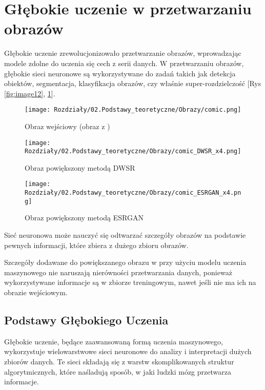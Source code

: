 
\section{Głębokie uczenie w przetwarzaniu obrazów}


Głębokie uczenie zrewolucjonizowało przetwarzanie obrazów, wprowadzając modele zdolne do uczenia się cech z serii danych. W przetwarzaniu obrazów, głębokie sieci neuronowe są wykorzystywane do zadań takich jak detekcja obiektów, segmentacja, klasyfikacja obrazów, czy właśnie super-rozdzielczość [Rys \ref{fig:image12},  \ref{fig:image13}].

\begin{figure}[ht]
    \centering
    \begin{minipage}[t]{0.3\linewidth}
        \texttt{[image: Rozdziały/02.Podstawy\_teoretyczne/Obrazy/comic.png]}
        \caption{Obraz wejściowy (obraz z \cite{zeyde2010single})}
        \label{fig:image11}
    \end{minipage}
    \hspace{0.5cm}
    \begin{minipage}[t]{0.3\linewidth}
        \texttt{[image: Rozdziały/02.Podstawy\_teoretyczne/Obrazy/comic\_DWSR\_x4.png]}
        \caption{Obraz powiększony metodą DWSR \cite{guo2017deep}}
        \label{fig:image12}
    \end{minipage}
    \hspace{0.5cm}
    \begin{minipage}[t]{0.3\linewidth}
        \texttt{[image: Rozdziały/02.Podstawy\_teoretyczne/Obrazy/comic\_ESRGAN\_x4.png]}
        \caption{Obraz powiększony metodą ESRGAN \cite{wang2018esrgan}}
        \label{fig:image13}
    \end{minipage}
\end{figure}

Sieć neuronowa może nauczyć się odtwarzać szczegóły obrazów na podstawie pewnych informacji, które zbiera z dużego zbioru obrazów. 

Szczegóły dodawane do powiększanego obrazu w przy użyciu modelu uczenia maszynowego nie naruszają nierówności przetwarzania danych, ponieważ wykorzystywane informacje są w zbiorze treningowym, nawet jeśli nie ma ich na obrazie wejściowym.


\subsection*{Podstawy Głębokiego Uczenia}
Głębokie uczenie, będące zaawansowaną formą uczenia maszynowego, wykorzystuje wielowarstwowe sieci neuronowe do analizy i interpretacji dużych zbiorów danych. Te sieci składają się z warstw skomplikowanych struktur algorytmicznych, które naśladują sposób, w jaki ludzki mózg przetwarza informacje.


